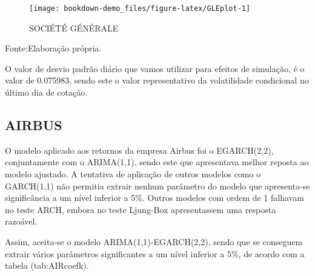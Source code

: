 \documentclass[
  12pt,
  a4paper,
  openany]{book}
\newenvironment{Shaded}{\begin{snugshade}}{\end{snugshade}}
\newcommand{\CommentTok}[1]{\textcolor[rgb]{0.56,0.35,0.01}{\textit{#1}}}
\newcommand{\DataTypeTok}[1]{\textcolor[rgb]{0.13,0.29,0.53}{#1}}
\newcommand{\DecValTok}[1]{\textcolor[rgb]{0.00,0.00,0.81}{#1}}
\newcommand{\KeywordTok}[1]{\textcolor[rgb]{0.13,0.29,0.53}{\textbf{#1}}}
\newcommand{\NormalTok}[1]{#1}
\newcommand{\OperatorTok}[1]{\textcolor[rgb]{0.81,0.36,0.00}{\textbf{#1}}}
\newcommand{\StringTok}[1]{\textcolor[rgb]{0.31,0.60,0.02}{#1}}
\begin{document}
\begin{figure}

{\centering \texttt{[image: bookdown-demo\_files/figure-latex/GLEplot-1]} 

}

\caption{SOCIÉTÉ GÉNÉRALE}\label{fig:GLEplot}
\end{figure}
\FloatBarrier
\centering

Fonte:Elaboração própria.

\justifying
\bigskip

O valor de desvio padrão diário que vamos utilizar para efeitos de simulação, é o valor de 0.075983, sendo este o valor representativo da volatilidade condicional no último dia de cotação.

\hypertarget{airbus}{%
\subsection{AIRBUS}\label{airbus}}

O modelo aplicado aos retornos da empresa Airbus foi o EGARCH(2,2), conjuntamente com o ARIMA(1,1), sendo este que apresentava melhor reposta ao modelo ajustado. A tentativa de aplicação de outros modelos como o GARCH(1,1) não permitia extrair nenhum parâmetro do modelo que apresenta-se significância a um nível inferior a 5\%. Outros modelos com ordem de 1 falhavam no teste ARCH, embora no teste Ljung-Box apresentassem uma resposta razoável.

Assim, aceita-se o modelo ARIMA(1,1)-EGARCH(2,2), sendo que se conseguem extrair vários parâmetros significantes a um nível inferior a 5\%, de acordo com a tabela \citet{ref}(tab:AIRcoefk).

\scriptsize

\begin{Shaded}
\end{Shaded}
\end{document}
